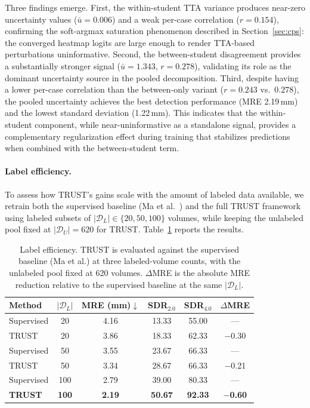 \documentclass[conference]{IEEEtran}
\begin{document}
Three findings emerge. First, the within-student TTA variance produces near-zero uncertainty values ($\bar{u} = 0.006$) and a weak per-case correlation ($r = 0.154$), confirming the soft-argmax saturation phenomenon described in Section~\ref{sec:cps}: the converged heatmap logits are large enough to render TTA-based perturbations uninformative. Second, the between-student disagreement provides a substantially stronger signal ($\bar{u} = 1.343$, $r = 0.278$), validating its role as the dominant uncertainty source in the pooled decomposition. Third, despite having a lower per-case correlation than the between-only variant ($r = 0.243$ vs.\ $0.278$), the pooled uncertainty achieves the best detection performance (MRE 2.19\,mm) and the lowest standard deviation (1.22\,mm). This indicates that the within-student component, while near-uninformative as a standalone signal, provides a complementary regularization effect during training that stabilizes predictions when combined with the between-student term.

\paragraph{Label efficiency.}
To assess how TRUST's gains scale with the amount of labeled data available, we retrain both the supervised baseline (Ma et al.~\cite{Ma2023_aortic_landmarks}) and the full TRUST framework using labeled subsets of $|\mathcal{D}_L| \in \{20, 50, 100\}$ volumes, while keeping the unlabeled pool fixed at $|\mathcal{D}_U|=620$ for TRUST. Table~\ref{tab:label_efficiency} reports the results.

\begin{table}[t]
\centering
\caption{Label efficiency. TRUST is evaluated against the supervised baseline (Ma et al.) at three labeled-volume counts, with the unlabeled pool fixed at 620 volumes. $\Delta$MRE is the absolute MRE reduction relative to the supervised baseline at the same $|\mathcal{D}_L|$.}
\label{tab:label_efficiency}
\setlength{\tabcolsep}{3pt}
\footnotesize
\begin{tabular}{l c c c c c}
\toprule
Method & $|\mathcal{D}_L|$ & MRE (mm)$\downarrow$ & \scriptsize SDR$_{2.0}$ & \scriptsize SDR$_{4.0}$ & $\Delta$MRE \\
\midrule
Supervised & 20  & 4.16 & 13.33 & 55.00 & --- \\
TRUST      & 20  & 3.86 & 18.33 & 62.33 & $-$0.30 \\
\midrule
Supervised & 50  & 3.55 & 23.67 & 66.33 & --- \\
TRUST      & 50  & 3.34 & 28.67 & 66.33 & $-$0.21 \\
\midrule
Supervised & 100 & 2.79 & 39.00 & 80.33 & --- \\
\textbf{TRUST} & \textbf{100} & \textbf{2.19} & \textbf{50.67} & \textbf{92.33} & \textbf{$-$0.60} \\
\bottomrule
\end{tabular}
\end{table}
\end{document}
